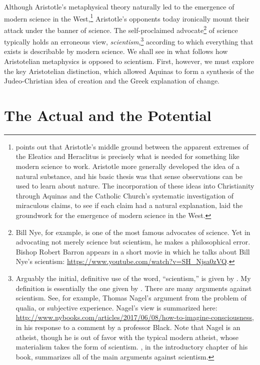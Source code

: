 \documentclass[twocolumn]{article}
\begin{document}
Although Aristotle's metaphysical theory naturally led to the emergence of
modern science in the West,\footnote{%
   \citet[Page 36]{f2014} points out that Aristotle's middle ground between the
   apparent extremes of the Eleatics and Heraclitus is precisely what is needed
   for something like modern science to work.  Aristotle more generally
   \citep[Pages 164--171]{f2014} developed the idea of a natural substance, and
   his basic thesis was that sense observations can be used to learn about
   nature.  The incorporation of these ideas into Christianity through Aquinas
   and the Catholic Church's systematic investigation of miraculous claims, to
   see if each claim had a natural explanation, laid the groundwork for the
   emergence of modern science in the West.
}
Aristotle's opponents today ironically mount their attack under the banner of
science.  The self-proclaimed advocate\footnote{%
   Bill Nye, for example, is one of the most famous advocates of science.  Yet
   in advocating not merely science but scientism, he makes a philosophical
   error.  Bishop Robert Barron appears in a short movie in which he talks
   about Bill Nye's scientism:
   \url{https://www.youtube.com/watch?v=SH_Njsa0zVQ}.%
}
of science typically holds an erroneous view, \emph{scientism},\footnote{%
   Arguably the initial, definitive use of the word, ``scientism,'' is given by
   \cite{s1991}.  My definition is essentially the one given by \cite{h2011}.
   There are many arguments against scientism.  See, for example, Thomas
   Nagel's argument from the problem of qualia, or subjective experience.
   Nagel's view is summarized here:
   \url{http://www.nybooks.com/articles/2017/06/08/how-to-imagine-consciousness},
   in his response to a comment by a professor Black.  Note that Nagel is an
   atheist, though he is out of favor with the typical modern atheist, whose
   materialism takes the form of scientism.  \cite{f2014}, in the introductory
   chapter of his book, summarizes all of the main arguments against
   scientism.%
}
according to which everything that exists is describable by modern science.  We
shall see in what follows how Aristotelian metaphysics is opposed to scientism.
First, however, we must explore the key Aristotelian distinction, which allowed
Aquinas to form a synthesis of the Judeo-Christian idea of creation and the
Greek explanation of change.

\section{The Actual and the Potential}
\end{document}

